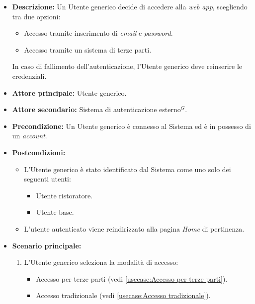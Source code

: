 \label{usecase:Effettua accesso}

\begin{itemize}
	\item \textbf{Descrizione:} Un Utente generico decide di accedere alla \textit{web app}, scegliendo tra due opzioni:
	\begin{itemize}
		\item Accesso tramite inserimento di \textit{email} e \textit{password}.
		\item Accesso tramite un sistema di terze parti.
	\end{itemize}
	In caso di fallimento dell'autenticazione, l'Utente generico deve reinserire le credenziali.

	\item \textbf{Attore principale:} Utente generico.
	\item \textbf{Attore secondario:} Sistema di autenticazione esterno$^G$.
	\item \textbf{Precondizione:}
	      Un Utente generico è connesso al Sistema ed è in possesso di un \textit{account}.

	\item \textbf{Postcondizioni:}
		\begin{itemize}      
			\item L'Utente generico è stato identificato dal Sistema come uno solo dei seguenti utenti:
	      		\begin{itemize}
		      		\item Utente ristoratore.
		      		\item Utente base.
	      		\end{itemize}
		  	\item L'utente autenticato viene reindirizzato alla pagina \textit{Home} di pertinenza.
		\end{itemize}

	\item \textbf{Scenario principale:}
	      \begin{enumerate}
		      \item L'Utente generico seleziona la modalità di accesso: 

			  \begin{itemize}
				\item Accesso per terze parti (vedi \autoref{usecase:Accesso per terze parti}).
				\item Accesso tradizionale (vedi \autoref{usecase:Accesso tradizionale}).
			  \end{itemize}


\end{enumerate}
\end{itemize}
